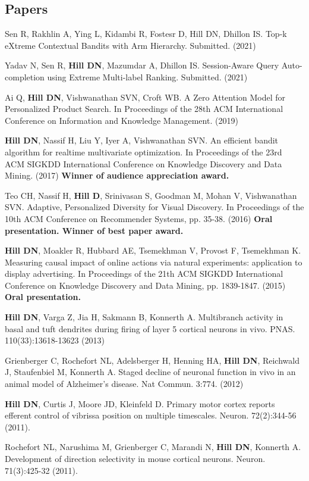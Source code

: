 \documentclass[line,11pt]{res}
\begin{document}
\begin{resume}
\section{Papers}
\vspace{0.1in}
Sen R, Rakhlin A, Ying L, Kidambi R, Fostesr D, Hill DN, Dhillon IS. Top-k eXtreme Contextual Bandits with Arm Hierarchy. Submitted. (2021)

Yadav N, Sen R, \textbf{Hill DN}, Mazumdar A, Dhillon IS. Session-Aware Query Auto-completion using Extreme Multi-label Ranking. Submitted. (2021)

Ai Q, \textbf{Hill DN}, Vishwanathan SVN, Croft WB. A Zero Attention Model for Personalized Product Search. In Proceedings of the 28th ACM International Conference on Information and Knowledge Management. (2019)

\textbf{Hill DN}, Nassif H, Liu Y, Iyer A, Vishwanathan SVN. An efficient bandit algorithm for realtime multivariate optimization. In Proceedings of the 23rd ACM SIGKDD International Conference on Knowledge Discovery and Data Mining. (2017) \textbf{Winner of audience appreciation award.}

Teo CH, Nassif H, \textbf{Hill D}, Srinivasan S, Goodman M, Mohan V, Vishwanathan SVN. Adaptive, Personalized Diversity for Visual Discovery. In Proceedings of the 10th ACM Conference on Recommender Systems, pp. 35-38. (2016) \textbf{Oral presentation. Winner of best paper award.}

\textbf{Hill DN}, Moakler R, Hubbard AE, Tsemekhman V, Provost F, Tsemekhman K.  Measuring causal impact of online actions via natural experiments: application to display advertising. In Proceedings of the 21th ACM SIGKDD International Conference on Knowledge Discovery and Data Mining, pp. 1839-1847. (2015) \textbf{Oral presentation.}

\textbf{Hill DN}, Varga Z, Jia H, Sakmann B, Konnerth A. Multibranch activity in basal and tuft dendrites during firing of layer 5 cortical neurons in vivo. PNAS. 110(33):13618-13623 (2013)

Grienberger C, Rochefort NL, Adelsberger H, Henning HA, \textbf{Hill DN}, Reichwald J, Staufenbiel M, Konnerth A. Staged decline of neuronal function in vivo in an animal model of Alzheimer's disease. Nat Commun. 3:774. (2012) 

\textbf{Hill DN}, Curtis J, Moore JD, Kleinfeld D.  Primary motor cortex reports efferent control of vibrissa position on multiple timescales. Neuron. 72(2):344-56 (2011).

Rochefort NL, Narushima M, Grienberger C, Marandi N, \textbf{Hill DN}, Konnerth A. Development of direction selectivity in mouse cortical neurons. Neuron. 71(3):425-32 (2011). 


\end{resume}
\end{document}

